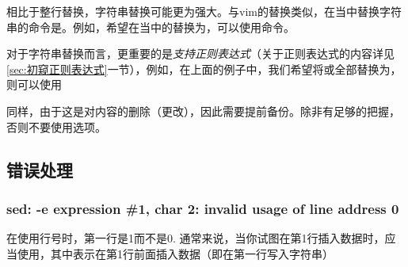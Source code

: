 相比于整行替换，字符串替换可能更为强大。与vim的替换类似，在当中替换字符串的命令是。例如，希望在当中的替换为，可以使用命令。

对于字符串替换而言，更重要的是\emph{支持正则表达式}（关于正则表达式的内容详见\ref{sec:初窥正则表达式}一节），例如，在上面的例子中，我们希望将或全部替换为，则可以使用

\begin{attention}
    同样，由于这是对内容的删除（更改），因此需要提前备份。除非有足够的把握，否则不要使用选项。
\end{attention}


\subsection{错误处理}\label{subsec:sed文本替换-错误处理}

\subsubsection{sed: -e expression \#1, char 2: invalid usage of line address 0}

在使用行号时，第一行是1而不是0. 通常来说，当你试图在第1行插入数据时，应当使用，其中表示在第1行前面插入数据（即在第一行写入字符串）